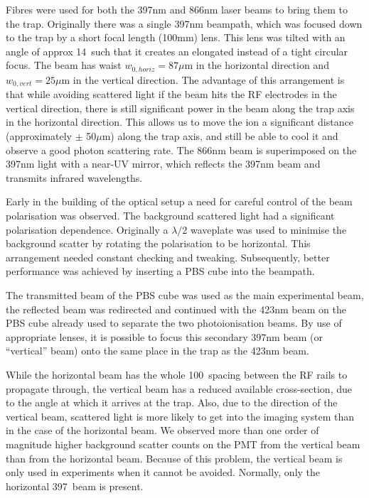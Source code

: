 Fibres were used for both the 397nm and 866nm laser beams to bring them to the trap. Originally there was a single 397nm beampath, which was focused down to the trap by a short focal length (100mm) lens. This lens was tilted with an angle of approx 14\degree\, such that it creates an elongated instead of a tight circular focus. The beam has waist $w_{0,horiz} = 87\mu$m in the horizontal direction and $w_{0,vert} = 25\mu$m in the vertical direction. The advantage of this arrangement is that while avoiding scattered light if the beam hits the RF electrodes in the vertical direction, there is still significant power in the beam along the trap axis in the horizontal direction. This allows us to move the ion a significant distance (approximately $\pm$ 50$\mu$m) along the trap axis, and still be able to cool it and observe a good photon scattering rate. The 866nm beam is superimposed on the 397nm light with a near-UV mirror, which reflects the 397nm beam and transmits infrared wavelengths. 

Early in the building of the optical setup a need for careful control of the beam polarisation was observed. The background scattered light had a significant polarisation dependence. Originally a $\lambda/2$ waveplate was used to minimise the background scatter by rotating the polarisation to be horizontal. This arrangement needed constant checking and tweaking. Subsequently, better performance was achieved by inserting a PBS cube into the beampath.

The transmitted beam of the PBS cube was used as the main experimental beam, the reflected beam was redirected and continued with the 423nm beam on the PBS cube already used to separate the two photoionisation beams. By use of appropriate lenses, it is possible to focus this secondary 397nm beam (or ``vertical'' beam)  onto the same place in the trap as the 423nm beam. 

While the horizontal beam has the whole 100\um\, spacing between the RF rails to propagate through, the vertical beam has a reduced available cross-section, due to the angle at which it arrives at the trap. Also, due to the direction of the vertical beam, scattered light is more likely to get into the imaging system than in the case of the horizontal beam.  We observed more than one order of magnitude higher background scatter counts on the PMT from the vertical beam than from the horizontal beam. Because of this  problem, the vertical beam is only used in experiments when it cannot be avoided. Normally, only the horizontal 397\nm\, beam is present.


